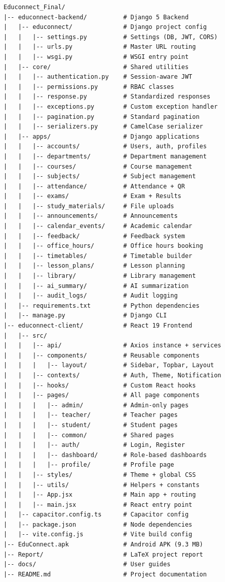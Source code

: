 \begin{lstlisting}[caption={Complete Project Directory Structure}, basicstyle=\ttfamily\scriptsize]
Educonnect_Final/
|-- educonnect-backend/          # Django 5 Backend
|   |-- educonnect/              # Django project config
|   |   |-- settings.py          # Settings (DB, JWT, CORS)
|   |   |-- urls.py              # Master URL routing
|   |   |-- wsgi.py              # WSGI entry point
|   |-- core/                    # Shared utilities
|   |   |-- authentication.py    # Session-aware JWT
|   |   |-- permissions.py       # RBAC classes
|   |   |-- response.py          # Standardized responses
|   |   |-- exceptions.py        # Custom exception handler
|   |   |-- pagination.py        # Standard pagination
|   |   |-- serializers.py       # CamelCase serializer
|   |-- apps/                    # Django applications
|   |   |-- accounts/            # Users, auth, profiles
|   |   |-- departments/         # Department management
|   |   |-- courses/             # Course management
|   |   |-- subjects/            # Subject management
|   |   |-- attendance/          # Attendance + QR
|   |   |-- exams/               # Exam + Results
|   |   |-- study_materials/     # File uploads
|   |   |-- announcements/       # Announcements
|   |   |-- calendar_events/     # Academic calendar
|   |   |-- feedback/            # Feedback system
|   |   |-- office_hours/        # Office hours booking
|   |   |-- timetables/          # Timetable builder
|   |   |-- lesson_plans/        # Lesson planning
|   |   |-- library/             # Library management
|   |   |-- ai_summary/          # AI summarization
|   |   |-- audit_logs/          # Audit logging
|   |-- requirements.txt         # Python dependencies
|   |-- manage.py                # Django CLI
|-- educonnect-client/           # React 19 Frontend
|   |-- src/
|   |   |-- api/                 # Axios instance + services
|   |   |-- components/          # Reusable components
|   |   |   |-- layout/          # Sidebar, Topbar, Layout
|   |   |-- contexts/            # Auth, Theme, Notification
|   |   |-- hooks/               # Custom React hooks
|   |   |-- pages/               # All page components
|   |   |   |-- admin/           # Admin-only pages
|   |   |   |-- teacher/         # Teacher pages
|   |   |   |-- student/         # Student pages
|   |   |   |-- common/          # Shared pages
|   |   |   |-- auth/            # Login, Register
|   |   |   |-- dashboard/       # Role-based dashboards
|   |   |   |-- profile/         # Profile page
|   |   |-- styles/              # Theme + global CSS
|   |   |-- utils/               # Helpers + constants
|   |   |-- App.jsx              # Main app + routing
|   |   |-- main.jsx             # React entry point
|   |-- capacitor.config.ts      # Capacitor config
|   |-- package.json             # Node dependencies
|   |-- vite.config.js           # Vite build config
|-- EduConnect.apk               # Android APK (9.3 MB)
|-- Report/                      # LaTeX project report
|-- docs/                        # User guides
|-- README.md                    # Project documentation
\end{lstlisting}
